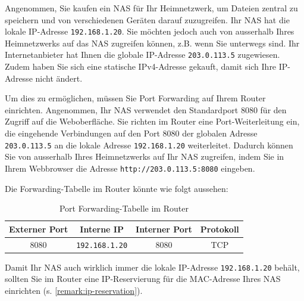 \begin{myexample}
	Angenommen, Sie kaufen ein \gls{NAS} für Ihr Heimnetzwerk, um Dateien zentral zu speichern und von verschiedenen Geräten darauf zuzugreifen. Ihr \gls{NAS} hat die lokale \gls{IP}-Adresse \texttt{192.168.1.20}. Sie möchten jedoch auch von ausserhalb Ihres Heimnetzwerks auf das \gls{NAS} zugreifen können, z.B. wenn Sie unterwegs sind. Ihr Internetanbieter hat Ihnen die globale \gls{IP}-Adresse \texttt{203.0.113.5} zugewiesen. Zudem haben Sie sich eine statische \gls{IP}v4-Adresse gekauft, damit sich Ihre \gls{IP}-Adresse nicht ändert.

	Um dies zu ermöglichen, müssen Sie Port Forwarding auf Ihrem Router einrichten. Angenommen, Ihr \gls{NAS} verwendet den Standardport 8080 für den Zugriff auf die Weboberfläche. Sie richten im Router eine Port-Weiterleitung ein, die eingehende Verbindungen auf den Port 8080 der globalen Adresse \texttt{203.0.113.5} an die lokale Adresse \texttt{192.168.1.20} weiterleitet. Dadurch können Sie von ausserhalb Ihres Heimnetzwerks auf Ihr \gls{NAS} zugreifen, indem Sie in Ihrem Webbrowser die Adresse \texttt{http://203.0.113.5:8080} eingeben.
	
	Die Forwarding-Tabelle im Router könnte wie folgt aussehen:
	\begin{table}[H]
		\centering
		\begin{tabular}{c|c|c|c}
			\textbf{Externer Port} & \textbf{Interne IP} & \textbf{Interner Port} & \textbf{Protokoll} \\
			\midrule\midrule
			8080 & \texttt{192.168.1.20} & 8080 & \gls{TCP} \\
	\end{tabular}
	\caption{Port Forwarding-Tabelle im Router}
\end{table}

	Damit Ihr \gls{NAS} auch wirklich immer die lokale \gls{IP}-Adresse \texttt{192.168.1.20} behält, sollten Sie im Router eine \gls{IP}-Reservierung für die \gls{MAC}-Adresse Ihres \gls{NAS} einrichten (s. \cref{remark:ip-reservation}).
\end{myexample}

